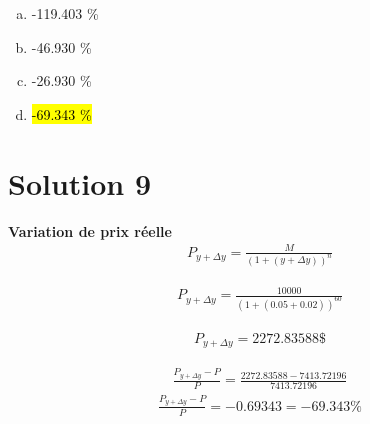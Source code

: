 \documentclass[10pt,a4paper]{article}
\begin{document}
\begin{enumerate}[a)]
\item -119.403 \%
\item -46.930 \%
\item -26.930 \%
\item \hl{-69.343 \%}
\end{enumerate}

\section*{Solution 9}
\textbf{Variation de prix réelle}
\begin{align*}
P_{y+\Delta y}=\frac{M}{(1+(y+\Delta y))^n}
\end{align*}

\begin{align*}
P_{y+\Delta y}=\frac{10000}{(1+(0.05+0.02))^{60}}
\end{align*}

\begin{align*}
P_{y+\Delta y}=2272.83588\$
\end{align*}

\begin{align*}
\frac{P_{y+\Delta y}-P}{P}=\frac{2272.83588- 7413.72196}{ 7413.72196}
\end{align*}
\begin{align*}
\frac{P_{y+\Delta y}-P}{P}=-0.69343=-69.343\%
\end{align*}
\end{document}
